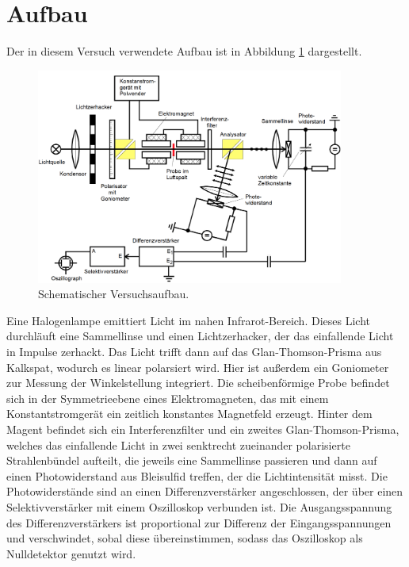 \section{Aufbau}
Der in diesem Versuch verwendete Aufbau ist in Abbildung \ref{fig:aufbau} dargestellt.
\FloatBarrier
\begin{figure}[h]
    \centering
    \includegraphics[width=0.9\textwidth]{aufbau.png}
    \caption{Schematischer Versuchsaufbau.}
    \label{fig:aufbau}
\end{figure}
\FloatBarrier
\noindent
Eine Halogenlampe emittiert Licht im nahen Infrarot-Bereich. Dieses Licht durchläuft eine Sammellinse und einen 
Lichtzerhacker, der das einfallende Licht in Impulse zerhackt. Das Licht trifft dann auf das Glan-Thomson-Prisma aus
Kalkspat, wodurch es linear polarsiert wird. Hier ist außerdem ein Goniometer zur Messung der Winkelstellung integriert. 
Die scheibenförmige Probe befindet sich in der Symmetrieebene eines Elektromagneten, das mit einem Konstantstromgerät 
ein zeitlich konstantes Magnetfeld erzeugt. Hinter dem Magent befindet sich ein Interferenzfilter und ein zweites 
Glan-Thomson-Prisma, welches das einfallende Licht in zwei senktrecht zueinander polarisierte Strahlenbündel aufteilt,
die jeweils eine Sammellinse passieren und dann auf einen Photowiderstand aus Bleisulfid treffen, der die Lichtintensität misst. 
Die Photowiderstände sind an einen Differenzverstärker angeschlossen, der über einen Selektivverstärker mit
einem Oszilloskop verbunden ist. Die Ausgangsspannung des Differenzverstärkers ist proportional zur Differenz der 
Eingangsspannungen und verschwindet, sobal diese übereinstimmen, sodass das Oszilloskop als Nulldetektor genutzt wird.


